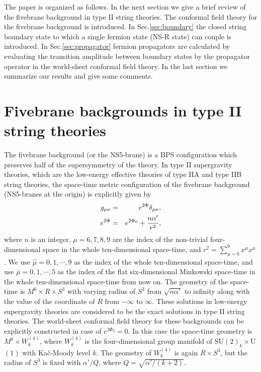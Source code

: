 \documentclass[a4paper,prd,preprint]{revtex4}
\begin{document}
The paper is organized as follows.
In the next section
 we give a brief review of the fivebrane background
 in type II string theories.
The conformal field theory for the fivebrane background is introduced.
In Sec.\ref{sec:boundary}
 the closed string boundary state
 to which a single fermion state (NS-R state) can couple is introduced.
In Sec.\ref{sec:propagator}
 fermion propagators are calculated by evaluating
 the transition amplitude between boundary states
 by the propagator operator in the world-sheet conformal field theory.
In the last section
 we summarize our results and give some comments.

\section{Fivebrane backgrounds in type II string theories}
\label{sec:CFT}

The fivebrane background (or the NS5-brane) is a BPS configuration
 which preserves half of the supersymmetry of the theory.
In type II supergravity theories,
 which are the low-energy effective theories
 of type IIA and type IIB  string theories,
 the space-time metric configuration of the fivebrane background
 (NS5-branes at the origin)
 is explicitly given by
\begin{eqnarray}
 g_{\mu\nu} &=& e^{2\Phi} \delta_{\mu\nu},
\\
 e^{2\Phi} &=& e^{2\Phi_0} + {{n \alpha'} \over {r^2}},
\label{dilaton}
\end{eqnarray}
where $n$ is an integer,
 $\mu=6,7,8,9$ are the index
 of the non-trivial four-dimensional space
 in the whole ten-dimensional space-time,
 and $r^2=\displaystyle{\sum_{\mu=6}^9 x^\mu x^\mu}$.
We use ${\hat \mu}=0,1,\cdots,9$
 as the index of the whole ten-dimensional space-time,
 and use ${\bar \mu}=0,1,\cdots,5$
 as the index of the flat six-dimensional Minkowski space-time
 in the whole ten-dimensional space-time from now on.
The geometry of the space-time is $M^6 \times R \times S^3$
 with varying radius of $S^3$ from $\sqrt{n\alpha'}$ to infinity
 along with the value of the coordinate of $R$
 from $-\infty$ to $\infty$.
These solutions in low-energy supergravity theories
 are considered to be the exact solutions
 in type II string theories.
The world-sheet conformal field theory for these backgrounds
 can be explicitly constructed in case of $e^{2\Phi_0}=0$.
In this case
 the space-time geometry is $M^6 \times W^{(4)}_k$,
 where $W^{(4)}_k$ is the four-dimensional group manifold
 of SU$(2)_k \times$U$(1)$ with Ka\v c-Moody level $k$.
The geometry of $W^{(4)}_k$ is again $R \times S^3$,
 but the radius of $S^3$ is fixed with $\alpha'/Q$,
 where $Q = \sqrt{\alpha'/(k+2)}$.
\end{document}
